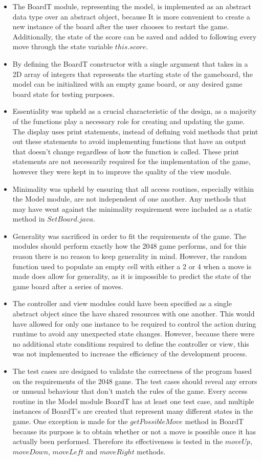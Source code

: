 \documentclass[12pt]{article}
\begin{document}
\begin{itemize}
  \item The BoardT module, representing the model, is implemented as an abstract data type over an abstract object, because It is more convenient to create a new instance of the board after the user chooses to restart the game. Additionally, the state of the score can be saved and added to following every move through the state variable $this.score$.
  \item By defining the BoardT constructor with a single argument that takes in a 2D array of integers that represents the starting state of the gameboard, the model can be initialized with an empty game board, or any desired game board state for testing purposes.
  \item Essentiality was upheld as a crucial characteristic of the design, as a majority of the functions play a necessary role for creating and updating the game. The display uses print statements, instead of defining void methods that print out these statements to avoid implementing functions that have an output that doesn't change regardless of how the function is called. These print statements are not necessarily required for the implementation of the game, however they were kept in to improve the quality of the view module.
  \item Minimality was upheld by ensuring that all access routines, especially within the Model module, are not independent of one another. Any methods that may have went against the minimality requirement were included as a static method in $SetBoard.java$.
  \item Generality was sacrificed in order to fit the requirements of the game. The modules should perform exactly how the 2048 game performs, and for this reason there is no reason to keep generality in mind. However, the random function used to populate an empty cell with either a 2 or 4 when a move is made does allow for generality, as it is impossible to predict the state of the game board after a series of moves. 
  \item The controller and view modules could have been specified as a single abstract object since the have shared resources with one another. This would have allowed for only one instance to be required to control the action during runtime to avoid any unexpected state changes. However, because there were no additional state conditions required to define the controller or view, this was not implemented to increase the efficiency of the development process.
  \item The test cases are designed to validate the correctness of the program based on the requirements of the 2048 game. The test cases should reveal any errors or unusual behaviour that don't match the rules of the game. Every access routine in the Model module BoardT has at least one test case, and multiple instances of BoardT's are created that represent many different states in the game. One exception is made for the $getPossibleMove$ method in BoardT because its purpose is to obtain whether or not a move is possible once it has actually been performed. Therefore its effectiveness is tested in the $moveUp$, $moveDown$, $moveLeft$ and $moveRight$ methods.  

\end{itemize}
\end{document}

